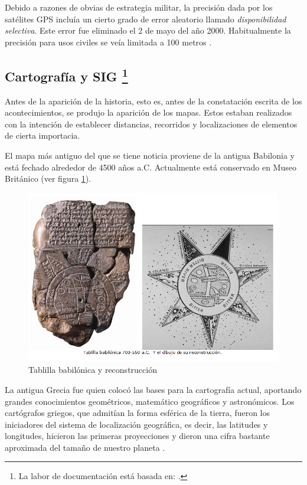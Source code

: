 Debido a razones de obvias de estrategia militar, la precisión dada por los satélites \ac{GPS} incluía un cierto grado de error aleatorio llamado \textit{disponibilidad selectiva}. Este error fue eliminado el 2 de mayo del año 2000. Habitualmente la precisión para usos civiles se veía limitada a 100 metros \cite{Corr00}.

\subsection{Cartografía y \acs{SIG} \protect\footnote{La labor de documentación está basada en: \cite{Diaz15}.} }

Antes de la aparición de la historia, esto es, antes de la constatación escrita de los acontecimientos, se produjo la aparición de los mapas. Estos estaban realizados con la intención de establecer distancias, recorridos y localizaciones de elementos de cierta importacia.

El mapa más antiguo del que se tiene noticia proviene de la antigua Babilonia y está fechado alrededor de 4500 años a.C. Actualmente está conservado en Museo Británico (ver figura \ref{fig:mapa-babilonio}).

\begin{figure}[h!btp]
\centering
\includegraphics[scale=0.5, fbox={\fboxrule} 0mm]{images/03-antecedentes/32-mapa_babilonio.jpg}
\caption{Tablilla babilónica y reconstrucción}
\label{fig:mapa-babilonio}
\end{figure}

La antigua Grecia fue quien colocó las bases para la cartografía actual, aportando grandes conocimientos geométricos, matemático geográficos y  astronómicos. Los cartógrafos griegos, que admitían la forma esférica de la tierra, fueron los iniciadores del sistema de localización geográfica, es decir, las latitudes y longitudes, hicieron las primeras proyecciones \cite{Schl07} y dieron una cifra bastante aproximada del tamaño de nuestro planeta \cite{Aup09}.

